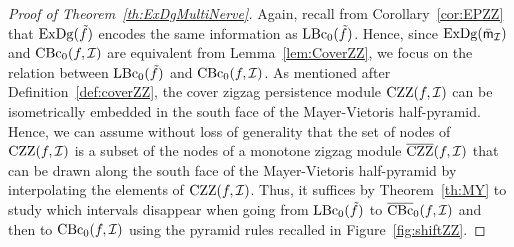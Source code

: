 \begin{proof}[Proof of Theorem~\ref{th:ExDgMultiNerve}]
Again, recall from Corollary~\ref{cor:EPZZ} 
that $\mathrm{ExDg}(\tilde f)$ encodes the same information as $\mathrm{LBc}_0(\tilde f)$. Hence, since $\mathrm{ExDg}(\bar {\sf{m}}_{\mathcal I})$ and $\mathrm{CBc}_0(f,\mathcal{I})$ are equivalent
from Lemma~\ref{lem:CoverZZ}, we focus on the relation between
$\mathrm{LBc}_0(\tilde f)$ and $\mathrm{CBc}_0(f,\mathcal{I})$.
As mentioned after Definition~\ref{def:coverZZ},
the cover zigzag persistence module $\mathrm{CZZ}(f,\mathcal{I})$ can be isometrically embedded in the south face of the Mayer-Vietoris half-pyramid.
Hence, we can assume without loss of generality that the set of nodes of $\mathrm{CZZ}(f,\mathcal{I})$
is a subset of the nodes of a monotone zigzag module $\overline{\mathrm{CZZ}}(f,\mathcal{I})$ %
that can be drawn along the south face of the Mayer-Vietoris half-pyramid
by interpolating the elements of $\mathrm{CZZ}(f,\mathcal{I})$.
Thus, it suffices by Theorem~\ref{th:MY} to study which intervals disappear when going from $\mathrm{LBc}_0(\tilde f)$ to $\overline{\mathrm{CBc}}_0(f,\mathcal{I})$ and then to $\mathrm{CBc}_0(f,\mathcal{I})$ 
using the pyramid rules recalled in Figure~\ref{fig:shiftZZ}.


\end{proof}
